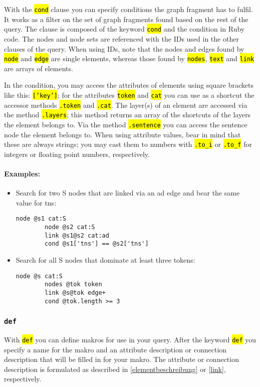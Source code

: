 \documentclass[12pt]{scrartcl}
\newcommand{\code}[1]{\hl{\texttt{#1}}}
\begin{document}
With the \code{cond} clause you can specify conditions the graph fragment has to fulfil.
It works as a filter on the set of graph fragments found based on the rest of the query.
The clause is composed of the keyword \code{cond} and the condition in Ruby code.
The nodes and node sets are referenced with the IDs used in the other clauses of the query.
When using IDs, note that the nodes and edges found by \code{node} and \code{edge} are single elements, whereas those found by \code{nodes}, \code{text} and \code{link} are arrays of elements.

In the condition, you may access the attributes of elements using square brackets like this: \code{['key']}; for the attributes \code{token} and \code{cat} you can use as a shortcut the accessor methods \code{.token} and \code{.cat}.
The layer(s) of an element are accessed via the method \code{.layers}; this method returns an array of the shortcuts of the layers the element belongs to.
Via the method \code{.sentence} you can access the sentence node the element belongs to.
When using attribute values, bear in mind that these are always strings; you may cast them to numbers with \code{.to\_i} or \code{.to\_f} for integers or floating point numbers, respectively.


\paragraph*{Examples:}
\begin{itemize}
	\item Search for two S nodes that are linked via an ad edge and bear the same value for tns:
	\begin{lstlisting}[gobble=8,aboveskip=.6em,belowskip=.2em]
		node @s1 cat:S
		node @s2 cat:S
		link @s1@s2 cat:ad
		cond @s1['tns'] == @s2['tns']
	\end{lstlisting}
	\item Search for all S nodes that dominate at least three tokens:
	\begin{lstlisting}[gobble=8,aboveskip=.6em,belowskip=.2em]
		node @s cat:S
		nodes @tok token
		link @s@tok edge+
		cond @tok.length >= 3
	\end{lstlisting}
\end{itemize}


\subsubsection{\texttt{def}}\label{def}

With \code{def} you can define makros for use in your query.
After the keyword \code{def} you specify a name for the makro and an attribute description or connection description that will be filled in for your makro.
The attribute or connection description is formulated as described in \ref{elementbeschreibung} or \ref{link}, respectively.
\end{document}
